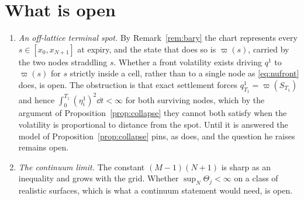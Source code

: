 \section{What is open}\label{sec:open}

\begin{enumerate}[leftmargin=1.6em,itemsep=0.4em]
\item \emph{An off-lattice terminal spot.} By Remark~\ref{rem:bary} the chart
represents every $s\in[x_0,x_{N+1}]$ at expiry, and the state that does so is
$\varpi(s)$, carried by the two nodes straddling $s$. Whether a front volatility
exists driving $q^1$ to $\varpi(s)$ for $s$ strictly inside a cell, rather than to
a single node as \eqref{eq:nufront} does, is open. The obstruction is that
exact settlement forces $q^1_{T_1}=\varpi(S_{T_1})$ and hence
$\int_0^{T_1}(\eta^1_i)^2\dd t<\infty$ for both surviving nodes, which by the
argument of Proposition~\ref{prop:collapse} they cannot both satisfy when the
volatility is proportional to distance from the spot. Until it is answered the
model of Proposition~\ref{prop:collapse} pins, as \cite{Wissel2007} does, and
the question he raises remains open.

\item \emph{The continuum limit.} The constant $(M-1)(N+1)$ is sharp as an
inequality and grows with the grid. Whether $\sup_N\Theta_j<\infty$ on a class of
realistic surfaces, which is what a continuum statement would need, is open.
\end{enumerate}
